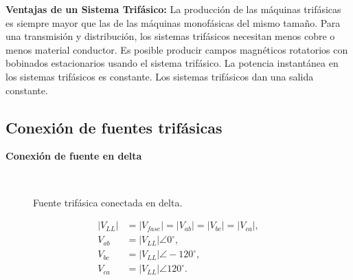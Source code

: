 \documentclass[12pt,a4paper]{article}
\begin{document}
\textbf{Ventajas de un Sistema Trifásico:} La producción de las máquinas trifásicas es siempre mayor que las de las máquinas monofásicas del mismo tamaño. Para una transmisión y distribución, los sistemas trifásicos necesitan menos cobre o menos material conductor. Es posible producir campos magnéticos rotatorios con bobinados estacionarios usando el sistema trifásico. La potencia instantánea en los sistemas trifásicos es constante. Los sistemas trifásicos dan una salida constante.
\subsection{Conexión de fuentes trifásicas}
\textbf{Conexión de fuente en delta}
\begin{figure}[H]
\centering
{}
\caption{Fuente trifásica conectada en delta.}~\label{fig:p6-fuente-delta}
\end{figure}
\begin{align*}
|V_{LL}|&=|V_{fase}|=|V_{ab}|=|V_{bc}|=|V_{ca}|,\\
V_{ab}&=|V_{LL}|\angle0^\circ,\\
V_{bc}&=|V_{LL}|\angle-120^\circ,\\
V_{ca}&=|V_{LL}|\angle120^\circ.
\end{align*}
\end{document}
